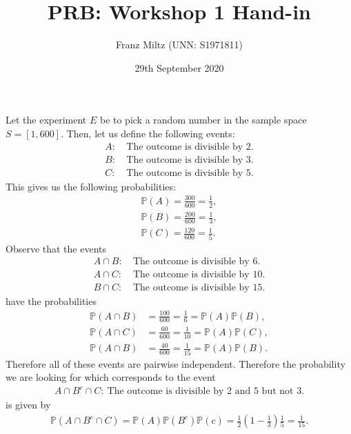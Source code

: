 \documentclass{article}
\title{PRB: Workshop 1 Hand-in}
\author{Franz Miltz (UNN: S1971811)}
\renewcommand{\P}{\mathbb{P}}
\begin{document}
\date{29th September 2020}
\maketitle
\noindent Let the experiment $E$ be to pick a random number in the sample space
$S=[1,600]$. Then, let us define the following events:
\begin{align*}
  A:\:&\text{The outcome is divisible by 2.}\\
  B:\:&\text{The outcome is divisible by 3.}\\
  C:\:&\text{The outcome is divisible by 5.}
\end{align*}
This gives us the following probabilities:
\begin{align*}
  \P(A)=\frac{300}{600}=\frac{1}{2},\\
  \P(B)=\frac{200}{600}=\frac{1}{3},\\
  \P(C)=\frac{120}{600}=\frac{1}{5}.
\end{align*}
Observe that the events
\begin{align*}
  A\cap B:\:&\text{The outcome is divisible by 6.}\\
  A\cap C:\:&\text{The outcome is divisible by 10.}\\
  B\cap C:\:&\text{The outcome is divisible by 15.}
\end{align*}
have the probabilities
\begin{align*}
  \P(A\cap B)&=\frac{100}{600}=\frac{1}{6}=\P(A)\P(B),\\
  \P(A\cap C)&=\frac{60}{600}=\frac{1}{10}=\P(A)\P(C),\\
  \P(A\cap B)&=\frac{40}{600}=\frac{1}{15}=\P(A)\P(B).
\end{align*}
Therefore all of these events are pairwise independent. Therefore the
probability we are looking for which corresponds to the event
\begin{align*}
  A\cap B^c \cap C:\:\text{The outcome is divisible by 2 and 5 but not 3.}
\end{align*}
is given by
\begin{align*}
  \P(A\cap B^c\cap C)= \P(A)\P(B^c)\P(c) = \frac{1}{2}\left(1-\frac{1}{3}\right)\frac{1}{5}=\frac{1}{15}.
\end{align*}
\end{document}
